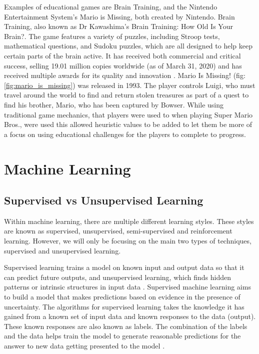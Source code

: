 	Examples of educational games are Brain Training, and the Nintendo Entertainment System's Mario is Missing, both created by Nintendo.  Brain Training, also known as Dr Kawashima's Brain Training: How Old Is Your Brain?. The game features a variety of puzzles, including Stroop tests, mathematical questions, and Sudoku puzzles, which are all designed to help keep certain parts of the brain active. It has received both commercial and critical success, selling 19.01 million copies worldwide (as of March 31, 2020) \cite{bt_sales} and has received multiple awards for its quality and innovation \cite{bt_award}. Mario Is Missing! (fig: \ref{fig:mario_is_missing}) was released in 1993. The player controls Luigi, who must travel around the world to find and return stolen treasures as part of a quest to find his brother, Mario, who has been captured by Bowser. While using traditional game mechanics, that players were used to when playing Super Mario Bros., were used this allowed heuristic values to be added to let them be more of a focus on using educational challenges for the players to complete to progress.
	

	\section{Machine Learning}
	
	
	\subsection{Supervised vs Unsupervised Learning}
	Within machine learning, there are multiple different learning styles. These styles are known as supervised, unsupervised, semi-supervised and reinforcement learning. However, we will only be focusing on the main two types of techniques, supervised and unsupervised learning. 
	
	Supervised learning trains a model on known input and output data so that it can predict future outputs, and unsupervised learning, which finds hidden patterns or intrinsic structures in input data \cite{geron2019hands}. Supervised machine learning aims to build a model that makes predictions based on evidence in the presence of uncertainty. The algorithms for supervised learning takes the knowledge it has gained from a known set of input data and known responses to the data (output). These known responses are also known as labels. The combination of the labels and the data helps train the model to generate reasonable predictions for the answer to new data getting presented to the model \cite{matlanintrotoml, geron2019hands}. 
	
